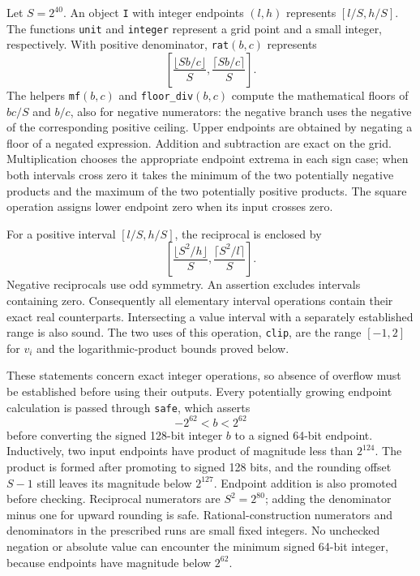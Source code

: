 Let $S=2^{40}$.  An object \texttt{I} with integer endpoints $(l,h)$
represents $[l/S,h/S]$.  The functions \texttt{unit} and
\texttt{integer} represent a grid point and a small integer,
respectively.  With positive denominator, \texttt{rat}$(b,c)$ represents
\[
 \left[\frac{\lfloor Sb/c\rfloor}{S},
       \frac{\lceil Sb/c\rceil}{S}\right].
\]
The helpers \texttt{mf}$(b,c)$ and \texttt{floor\_div}$(b,c)$ compute
the mathematical floors of $bc/S$ and $b/c$, also for negative
numerators: the negative branch uses the negative of the corresponding
positive ceiling.  Upper endpoints are obtained by negating a floor of
a negated expression.  Addition and subtraction are exact on the
grid.  Multiplication chooses the appropriate endpoint extrema in
each sign case; when both intervals cross zero it takes the minimum
of the two potentially negative products and the maximum of the two
potentially positive products.  The square operation assigns lower
endpoint zero when its input crosses zero.

For a positive interval $[l/S,h/S]$, the reciprocal is enclosed by
\[
 \left[\frac{\lfloor S^2/h\rfloor}{S},
       \frac{\lceil S^2/l\rceil}{S}\right].
\]
Negative reciprocals use odd symmetry.  An assertion excludes intervals
containing zero.  Consequently all elementary interval operations
contain their exact real counterparts.  Intersecting a value interval
with a separately established range is also sound.  The two uses of
this operation, \texttt{clip}, are the range $[-1,2]$ for $v_i$ and
the logarithmic-product bounds proved below.

These statements concern exact integer operations, so absence of
overflow must be established before using their outputs.  Every
potentially growing endpoint calculation is passed through
\texttt{safe}, which asserts
\[
 -2^{62}<b<2^{62}
\]
before converting the signed 128-bit integer $b$ to a signed 64-bit
endpoint.  Inductively, two input endpoints have product of magnitude
less than $2^{124}$.  The product is formed after promoting to signed
128 bits, and the rounding offset $S-1$ still leaves its magnitude
below $2^{127}$.  Endpoint addition is also promoted before checking.
Reciprocal numerators are $S^2=2^{80}$; adding the denominator minus
one for upward rounding is safe.  Rational-construction numerators
and denominators in the prescribed runs are small fixed integers.
No unchecked negation or absolute value can encounter the minimum
signed 64-bit integer, because endpoints have magnitude below $2^{62}$.


